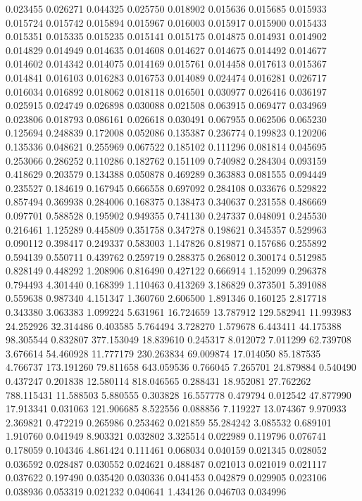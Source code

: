 0.023455
0.026271
0.044325
0.025750
0.018902
0.015636
0.015685
0.015933
0.015724
0.015742
0.015894
0.015967
0.016003
0.015917
0.015900
0.015433
0.015351
0.015335
0.015235
0.015141
0.015175
0.014875
0.014931
0.014902
0.014829
0.014949
0.014635
0.014608
0.014627
0.014675
0.014492
0.014677
0.014602
0.014342
0.014075
0.014169
0.015761
0.014458
0.017613
0.015367
0.014841
0.016103
0.016283
0.016753
0.014089
0.024474
0.016281
0.026717
0.016034
0.016892
0.018062
0.018118
0.016501
0.030977
0.026416
0.036197
0.025915
0.024749
0.026898
0.030088
0.021508
0.063915
0.069477
0.034969
0.023806
0.018793
0.086161
0.026618
0.030491
0.067955
0.062506
0.065230
0.125694
0.248839
0.172008
0.052086
0.135387
0.236774
0.199823
0.120206
0.135336
0.048621
0.255969
0.067522
0.185102
0.111296
0.081814
0.045695
0.253066
0.286252
0.110286
0.182762
0.151109
0.740982
0.284304
0.093159
0.418629
0.203579
0.134388
0.050878
0.469289
0.363883
0.081555
0.094449
0.235527
0.184619
0.167945
0.666558
0.697092
0.284108
0.033676
0.529822
0.857494
0.369938
0.284006
0.168375
0.138473
0.340637
0.231558
0.486669
0.097701
0.588528
0.195902
0.949355
0.741130
0.247337
0.048091
0.245530
0.216461
1.125289
0.445809
0.351758
0.347278
0.198621
0.345357
0.529963
0.090112
0.398417
0.249337
0.583003
1.147826
0.819871
0.157686
0.255892
0.594139
0.550711
0.439762
0.259719
0.288375
0.268012
0.300174
0.512985
0.828149
0.448292
1.208906
0.816490
0.427122
0.666914
1.152099
0.296378
0.794493
4.301440
0.168399
1.110463
0.413269
3.186829
0.373501
5.391088
0.559638
0.987340
4.151347
1.360760
2.606500
1.891346
0.160125
2.817718
0.343380
3.063383
1.099224
5.631961
16.724659
13.787912
129.582941
11.993983
24.252926
32.314486
0.403585
5.764494
3.728270
1.579678
6.443411
44.175388
98.305544
0.832807
377.153049
18.839610
0.245317
8.012072
7.011299
62.739708
3.676614
54.460928
11.777179
230.263834
69.009874
17.014050
85.187535
4.766737
173.191260
79.811658
643.059536
0.766045
7.265701
24.879884
0.540490
0.437247
0.201838
12.580114
818.046565
0.288431
18.952081
27.762262
788.115431
11.588503
5.880555
0.303828
16.557778
0.479794
0.012542
47.877990
17.913341
0.031063
121.906685
8.522556
0.088856
7.119227
13.074367
9.970933
2.369821
0.472219
0.265986
0.253462
0.021859
55.284242
3.085532
0.689101
1.910760
0.041949
8.903321
0.032802
3.325514
0.022989
0.119796
0.076741
0.178059
0.104346
4.861424
0.111461
0.068034
0.040159
0.021345
0.028052
0.036592
0.028487
0.030552
0.024621
0.488487
0.021013
0.021019
0.021117
0.037622
0.197490
0.035420
0.030336
0.041453
0.042879
0.029905
0.023106
0.038936
0.053319
0.021232
0.040641
1.434126
0.046703
0.034996
